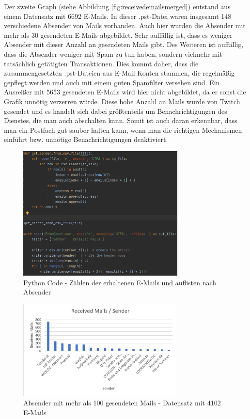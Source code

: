 \noindent Der zweite Graph (siehe Abbildung \ref{fig:receivedemailsmerged}) entstand aus einem Datensatz mit 6692 E-Mails. In dieser .pst-Datei waren insgesamt 148 verschiedene Absender von Mails vorhanden. Auch hier wurden die Absender mit mehr als 30 gesendeten E-Mails abgebildet. Sehr auffällig ist, dass es weniger Absender mit dieser Anzahl an gesendeten Mails gibt. Des Weiteren ist auffällig, dass die Absender weniger mit Spam zu tun haben, sondern vielmehr mit tatsächlich getätigten Transaktionen. Dies kommt daher, dass die zusammengesetzten .pst-Dateien aus E-Mail Konten stammen, die regelmäßig gepflegt werden und auch mit einem guten Spamfilter versehen sind. Ein Ausreißer mit 5653 gesendeten E-Mails wird hier nicht abgebildet, da er sonst die Grafik unnötig verzerren würde. Diese hohe Anzahl an Mails wurde von \glqq{}Twitch\grqq{} gesendet und es handelt sich dabei größtenteils um Benachrichtigungen des Dienstes, die man auch abschalten kann. Somit ist auch daran erkennbar, dass man ein Postfach gut sauber halten kann, wenn man die richtigen Mechanismen einführt bzw. unnötige Benachrichtigungen deaktiviert.



\begin{figure}
    \centering
    \includegraphics[width=0.75\textwidth]{images/Count_Received_Mails_Count_Sender.PNG}
    \caption{Python Code - Zählen der erhaltenen E-Mails und auflisten nach Absender} 
    \label{fig:countemailssender}
\end{figure}

\begin{figure}
    \centering
    \includegraphics[width=0.75\textwidth]{images/Auswertung_Empfange_Emails.png}
    \caption{Absender mit mehr als 100 gesendeten Mails - Datensatz mit 4102 E-Mails} 
    \label{fig:receivedemails}
\end{figure}

